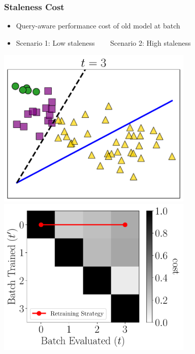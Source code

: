 \documentclass[pdf]{beamer}
\begin{document}
\begin{frame}
    \frametitle{Staleness Cost}
    \begin{itemize}
        \item {\textcolor{green!50!black}{Query-aware}} performance cost of old model \Mtprime at batch \ttime
        \item Scenario 1: Low staleness ~~~ Scenario 2: High staleness
      \end{itemize}
      \begin{minipage}{0.5\textwidth}
          \begin{center}
              \includegraphics[width=0.7\textwidth]{figs/far_queries_illustration.pdf}\\[1mm]
              \includegraphics[width=0.7\textwidth]{figs/far_queries.pdf}
            \end{center}
          \end{minipage}%
          \begin{minipage}{0.5\textwidth}
            \begin{center}

\end{center}
\end{minipage}
\end{frame}
\end{document}
